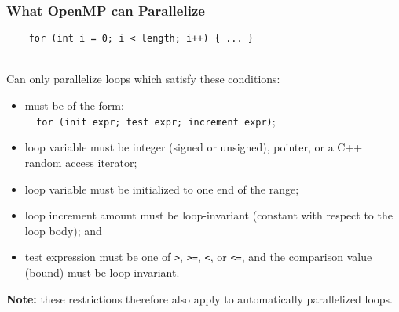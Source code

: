 \documentclass[aspectratio=43]{beamer}
\newenvironment{changemargin}[1]{%
  \begin{list}{}{%
    \setlength{\topsep}{0pt}%
    \setlength{\leftmargin}{#1}%
    \setlength{\rightmargin}{1em}
    \setlength{\listparindent}{\parindent}%
    \setlength{\itemindent}{\parindent}%
    \setlength{\parsep}{\parskip}%
  }%
  \item[]}{\end{list}}
\begin{document}
\begin{frame}[fragile]
  \frametitle{What OpenMP can Parallelize}

  \begin{changemargin}{1.5cm}
\begin{verbatim}
    for (int i = 0; i < length; i++) { ... }
\end{verbatim}~\\[1em]

    Can only parallelize loops which satisfy these conditions:
\begin{itemize}
\item must be of the form:\\{\tt ~~for (init expr; test expr; increment expr)};
\item loop variable must be integer (signed or unsigned), pointer, or a C++
random access iterator;
\item loop variable must be initialized to one end of the range;
\item loop increment amount must be loop-invariant (constant with respect to the loop body); and
\item test expression must be one of {\tt >}, {\tt >=}, {\tt <}, or {\tt <=}, and the comparison value (bound) must be loop-invariant.
\end{itemize}

{\bf Note:} these restrictions therefore also apply to automatically parallelized
loops.
  \end{changemargin}

\end{frame}
\end{document}
